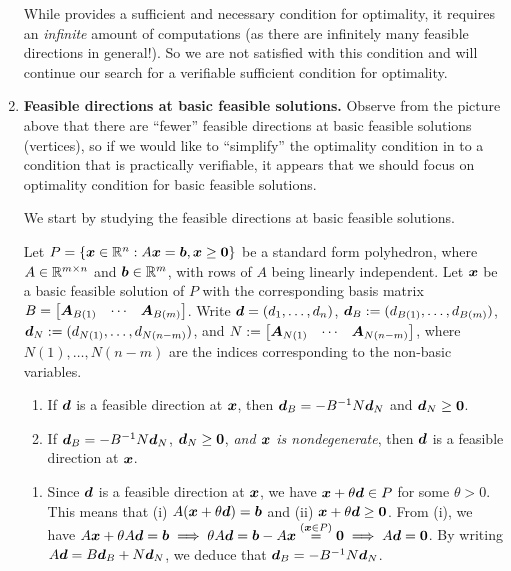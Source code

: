\begin{enumerate}
While  provides a sufficient and
necessary condition for optimality, it requires an \emph{infinite} amount of
computations (as there are infinitely many feasible directions in general!).
So we are not satisfied with this condition and will continue our search
 for a verifiable sufficient condition for optimality.

\item \label{it:feas-dir-bfs} \textbf{Feasible directions at basic feasible
solutions.} Observe from the picture above that there are ``fewer'' feasible
directions at basic feasible solutions (vertices), so if we would like to
``simplify'' the optimality condition in 
to a condition that is practically verifiable, it appears that we should focus
on optimality condition for basic feasible solutions.

We start by studying the feasible directions at basic feasible solutions. 
\begin{proposition}
\label{prp:feas-dir-bfs}
Let \(P=\{\bm{x}\in\mathbb{R}^n:A\bm{x}=\bm{b}, \bm{x}\ge\bm{0}\}\) be a
standard form polyhedron, where \(A\in\mathbb{R}^{m\times n}\) and \(\bm{b}\in\mathbb{R}^m\),
with rows of \(A\) being linearly independent. Let \(\bm{x}\) be a basic
feasible solution of \(P\) with the corresponding basis matrix
\(B=\begin{bmatrix}\bm{A}_{B(1)}&\cdots&\bm{A}_{B(m)}\end{bmatrix}\). Write
\(\bm{d}=(d_1,\dotsc,d_n)\), \(\bm{d}_{B}:=(d_{B(1)},\dotsc,d_{B(m)})\),
\(\bm{d}_{N}:=(d_{N(1)},\dotsc,d_{N(n-m)})\), and
\(N:=\begin{bmatrix}\bm{A}_{N(1)}&\cdots&\bm{A}_{N(n-m)}\end{bmatrix}\),
where \(N(1),\dotsc,N(n-m)\) are the indices corresponding to the non-basic
variables.

\begin{enumerate}
\item If \(\bm{d}\) is a feasible direction at \(\bm{x}\), then
\(\bm{d}_{B}=-B^{-1}N\bm{d}_{N}\) and \(\bm{d}_{N}\ge
\bm{0}\).
\item If \(\bm{d}_{B}=-B^{-1}N\bm{d}_{N}\), \(\bm{d}_{N}\ge
\bm{0}\), \emph{and \(\bm{x}\) is nondegenerate}, then \(\bm{d}\) is a
feasible direction at \(\bm{x}\).
\end{enumerate}

\end{proposition}
\begin{pf}
\begin{enumerate}
\item Since \(\bm{d}\) is a feasible direction at \(\bm{x}\), we have
\(\bm{x}+\theta\bm{d}\in P\) for some \(\theta>0\). This means that (i)
\(A(\bm{x}+\theta\bm{d})=\bm{b}\) and (ii)
\(\bm{x}+\theta\bm{d}\ge\bm{0}\). From (i), we have \(A\bm{x}+\theta
A\bm{d}=\bm{b}\implies \theta
A\bm{d}=\bm{b}-A\bm{x}\overset{(\bm{x}\in P)}{=}\bm{0} \implies
A\bm{d}=\bm{0}\). By writing \(A\bm{d}=B\bm{d}_{B}+N\bm{d}_{N}\), we
deduce that \(\bm{d}_{B}=-B^{-1}N\bm{d}_{N}\).


\end{enumerate}
\end{pf}
\end{enumerate}
